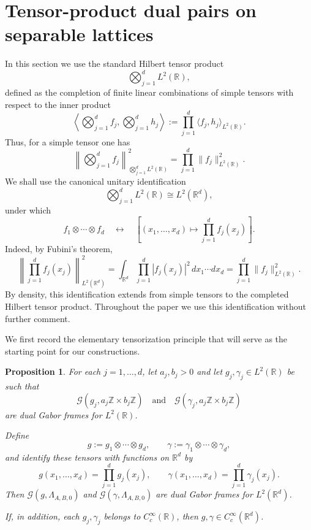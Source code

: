 \documentclass[final,1p,times,authoryear]{elsarticle}
\newtheorem{proposition}[theorem]{Proposition}
\theoremstyle{definition}
\newcommand{\R}{\mathbb{R}}
\newcommand{\Z}{\mathbb{Z}}
\newcommand{\1}{\mathbf{1}}
\begin{document}
\section{Tensor-product dual pairs on separable lattices}


In this section we use the standard Hilbert tensor product
$$
\bigotimes_{j=1}^d L^2(\R),
$$
defined as the completion of finite linear combinations of simple tensors with respect to the inner product
$$
\left\langle \bigotimes_{j=1}^d f_j,\bigotimes_{j=1}^d h_j \right\rangle
:=
\prod_{j=1}^d \langle f_j,h_j\rangle_{L^2(\R)}.
$$
Thus, for a simple tensor one has
$$
\left\| \bigotimes_{j=1}^d f_j \right\|^2_{\bigotimes_{j=1}^d L^2(\R)}
=
\prod_{j=1}^d \|f_j\|_{L^2(\R)}^2.
$$
We shall use the canonical unitary identification
$$
\bigotimes_{j=1}^d L^2(\R) \cong L^2(\R^d),
$$
under which
$$
f_1\otimes\cdots\otimes f_d
\quad\longleftrightarrow\quad
\left[(x_1,\dots,x_d)\mapsto \prod_{j=1}^d f_j(x_j)\right].
$$
Indeed, by Fubini's theorem,
$$
\left\|\prod_{j=1}^d f_j(x_j)\right\|_{L^2(\R^d)}^2
=
\int_{\R^d}\prod_{j=1}^d |f_j(x_j)|^2\,dx_1\cdots dx_d
=
\prod_{j=1}^d\|f_j\|_{L^2(\R)}^2.
$$
By density, this identification extends from simple tensors to the completed Hilbert tensor product.
Throughout the paper we use this identification without further comment.

We first record the elementary tensorization principle that will serve as the starting point
for our constructions.

\begin{proposition}\label{prop:tensor_duals}
For each $j=1,\dots,d$, let $a_j,b_j>0$ and let $g_j,\gamma_j\in L^2(\R)$ be such that
$$
\mathcal G(g_j,a_j\Z\times b_j\Z)
\quad\text{and}\quad
\mathcal G(\gamma_j,a_j\Z\times b_j\Z)
$$
are dual Gabor frames for $L^2(\R)$.

{Define
$$
g:=g_1\otimes \cdots \otimes g_d,
\qquad
\gamma:=\gamma_1\otimes \cdots \otimes \gamma_d,
$$
and identify these tensors with functions on $\R^d$ by
$$
g(x_1,\dots,x_d)=\prod_{j=1}^d g_j(x_j),
\qquad
\gamma(x_1,\dots,x_d)=\prod_{j=1}^d \gamma_j(x_j).
$$
Then $\mathcal G(g,\Lambda_{A,B,0})$ and $\mathcal G(\gamma,\Lambda_{A,B,0})$
are dual Gabor frames for $L^2(\R^d)$.}

If, in addition, each $g_j,\gamma_j$ belongs to $C_c^\infty(\R)$, then
$g,\gamma\in C_c^\infty(\R^d)$.
\end{proposition}
\end{document}
